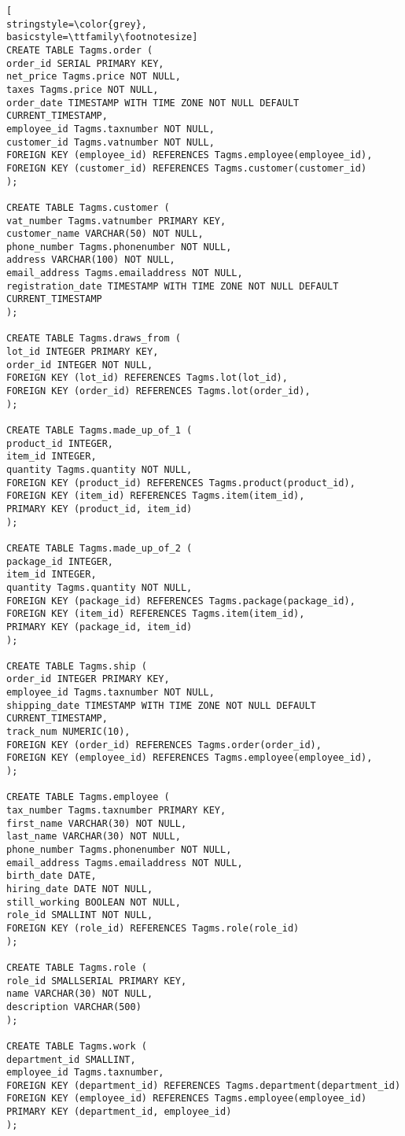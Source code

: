 \begin{lstlisting}[
stringstyle=\color{grey},
basicstyle=\ttfamily\footnotesize]
CREATE TABLE Tagms.order (
order_id SERIAL PRIMARY KEY,
net_price Tagms.price NOT NULL,
taxes Tagms.price NOT NULL,
order_date TIMESTAMP WITH TIME ZONE NOT NULL DEFAULT CURRENT_TIMESTAMP,
employee_id Tagms.taxnumber NOT NULL,
customer_id Tagms.vatnumber NOT NULL,
FOREIGN KEY (employee_id) REFERENCES Tagms.employee(employee_id),
FOREIGN KEY (customer_id) REFERENCES Tagms.customer(customer_id)
);

CREATE TABLE Tagms.customer (
vat_number Tagms.vatnumber PRIMARY KEY,
customer_name VARCHAR(50) NOT NULL,
phone_number Tagms.phonenumber NOT NULL,
address VARCHAR(100) NOT NULL,
email_address Tagms.emailaddress NOT NULL,
registration_date TIMESTAMP WITH TIME ZONE NOT NULL DEFAULT CURRENT_TIMESTAMP
);

CREATE TABLE Tagms.draws_from (
lot_id INTEGER PRIMARY KEY,
order_id INTEGER NOT NULL,
FOREIGN KEY (lot_id) REFERENCES Tagms.lot(lot_id),
FOREIGN KEY (order_id) REFERENCES Tagms.lot(order_id),
);

CREATE TABLE Tagms.made_up_of_1 (
product_id INTEGER,
item_id INTEGER,
quantity Tagms.quantity NOT NULL,
FOREIGN KEY (product_id) REFERENCES Tagms.product(product_id),
FOREIGN KEY (item_id) REFERENCES Tagms.item(item_id),
PRIMARY KEY (product_id, item_id)
);

CREATE TABLE Tagms.made_up_of_2 (
package_id INTEGER,
item_id INTEGER,
quantity Tagms.quantity NOT NULL,
FOREIGN KEY (package_id) REFERENCES Tagms.package(package_id),
FOREIGN KEY (item_id) REFERENCES Tagms.item(item_id),
PRIMARY KEY (package_id, item_id)
);

CREATE TABLE Tagms.ship (
order_id INTEGER PRIMARY KEY,
employee_id Tagms.taxnumber NOT NULL,
shipping_date TIMESTAMP WITH TIME ZONE NOT NULL DEFAULT CURRENT_TIMESTAMP,
track_num NUMERIC(10),
FOREIGN KEY (order_id) REFERENCES Tagms.order(order_id),
FOREIGN KEY (employee_id) REFERENCES Tagms.employee(employee_id),
);

CREATE TABLE Tagms.employee (
tax_number Tagms.taxnumber PRIMARY KEY,
first_name VARCHAR(30) NOT NULL,
last_name VARCHAR(30) NOT NULL,
phone_number Tagms.phonenumber NOT NULL,
email_address Tagms.emailaddress NOT NULL,
birth_date DATE,
hiring_date DATE NOT NULL,
still_working BOOLEAN NOT NULL,
role_id SMALLINT NOT NULL,
FOREIGN KEY (role_id) REFERENCES Tagms.role(role_id)
);

CREATE TABLE Tagms.role (
role_id SMALLSERIAL PRIMARY KEY,
name VARCHAR(30) NOT NULL,
description VARCHAR(500)
);

CREATE TABLE Tagms.work (
department_id SMALLINT,
employee_id Tagms.taxnumber,
FOREIGN KEY (department_id) REFERENCES Tagms.department(department_id)
FOREIGN KEY (employee_id) REFERENCES Tagms.employee(employee_id)
PRIMARY KEY (department_id, employee_id)
);


\end{lstlisting}
